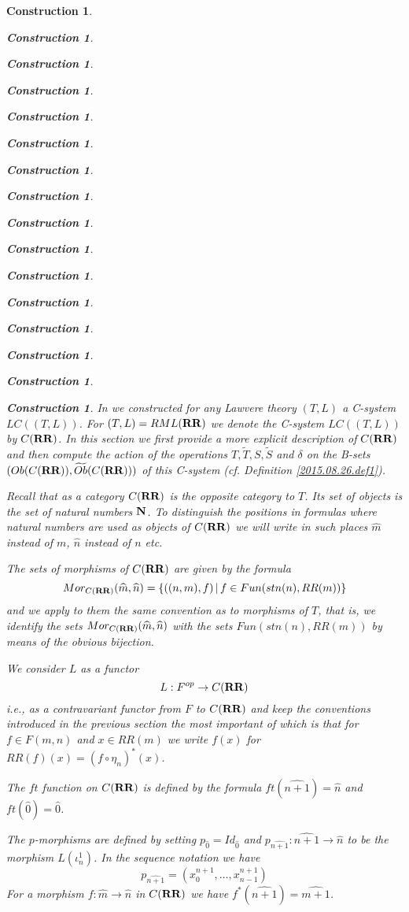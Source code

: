 \documentclass[12pt]{amsart}
\newenvironment{eq}{\begin{equation}}{\end{equation}}
\newtheorem{construction}[proposition]{Construction}
\newcommand{\llabel}[1]{\label{#1}}
\newcommand{\sr}{\rightarrow}
\newcommand{\nn}{{\bf N\rm}}
\newcommand{\nat}{\nn}
\newcommand{\wt}{\widetilde}
\newcommand{\wh}{\widehat}
\newcommand{\mbind}[1]{{#1^*}}
\newcommand{\RR}{{\bf RR}}
\begin{document}
\begin{construction}
\begin{construction}
\begin{construction}
\begin{construction}
\begin{construction}
\begin{construction}
\begin{construction}
\begin{construction}
\begin{construction}
\begin{construction}
\begin{construction}
\begin{construction}
\begin{construction}
\begin{construction}
\begin{construction}
\begin{construction}
In \cite{LandC} we constructed for any Lawvere theory $(T,L)$ a C-system
$LC((T,L))$. For $(T,L)=RML(\RR)$ we denote the C-system $LC((T,L))$ by
$C(\RR)$. In this section we first provide a more explicit description of
$C(\RR)$ and then compute the action of the operations $T,\wt{T},S,\wt{S}$ and
$\delta$ on the B-sets $(Ob(C(\RR)),\wt{Ob}(C(\RR)))$ of this C-system
(cf.{} Definition \ref{2015.08.26.def1}).

Recall that as a category $C(\RR)$ is the opposite category to $T$.  Its set of
objects is the set of natural numbers $\nat$. To distinguish the positions in
formulas where natural numbers are used as objects of $C(\RR)$ we will write in
such places $\wh{m}$ instead of $m$, $\wh{n}$ instead of $n$ etc.

The sets of morphisms of $C(\RR)$ are given by the formula 
%
$$Mor_{C(\RR)}(\wh{m},\wh{n})=\{((n,m),f)\,|\,f\in Fun(stn(n),RR(m))\}$$
%
and we apply to them the same convention as to morphisms of $T$, that is, we
identify the sets $Mor_{C(\RR)}(\wh{m},\wh{n})$ with the sets
$Fun(stn(n),RR(m))$ by means of the obvious bijection.

We consider $L$ as a functor
%
$${L}:F^{op}\sr C(\RR)$$
%
i.e., as a contravariant functor from $F$ to $C(\RR)$ and keep the conventions
introduced in the previous section the most important of which is that for
$f\in F(m,n)$ and $x\in RR(m)$ we write $f(x)$ for $RR(f)(x)=\mbind{(f\circ
  \eta_{n})}(x)$.

The $ft$ function on $C(\RR)$ is defined by the formula $ft(\wh{n+1})=\wh{n}$
and $ft(\wh{0})=\wh{0}$.

The $p$-morphisms are defined by setting $p_{\wh{0}}=Id_{\wh{0}}$ and
$p_{\wh{n+1}}:\wh{n+1}\sr \wh{n}$ to be the morphism $L(\iota_n^1)$. In the
sequence notation we have
%
\begin{eq}\llabel{2015.08.24.eq6}
p_{\wh{n+1}}=(x_0^{n+1},\dots,x_{n-1}^{n+1})
\end{eq}%
%
For a morphism $f:\wh{m}\sr \wh{n}$ in $C(\RR)$ we have $f^*(\wh{n+1})=\wh{m+1}$. 


\end{construction}
\end{construction}
\end{construction}
\end{construction}
\end{construction}
\end{construction}
\end{construction}
\end{construction}
\end{construction}
\end{construction}
\end{construction}
\end{construction}
\end{construction}
\end{construction}
\end{construction}
\end{construction}
\end{document}
